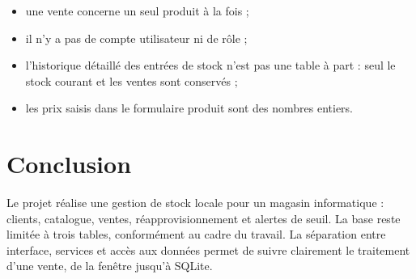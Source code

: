 \documentclass[11pt,a4paper]{article}
\begin{document}
\begin{itemize}
    \item une vente concerne un seul produit à la fois ;
    \item il n'y a pas de compte utilisateur ni de rôle ;
    \item l'historique détaillé des entrées de stock n'est pas une table à part : seul le stock courant et les ventes sont conservés ;
    \item les prix saisis dans le formulaire produit sont des nombres entiers.
\end{itemize}

\section{Conclusion}

Le projet réalise une gestion de stock locale pour un magasin informatique : clients, catalogue, ventes, réapprovisionnement et alertes de seuil. La base reste limitée à trois tables, conformément au cadre du travail. La séparation entre interface, services et accès aux données permet de suivre clairement le traitement d'une vente, de la fenêtre jusqu'à SQLite.
\end{document}
